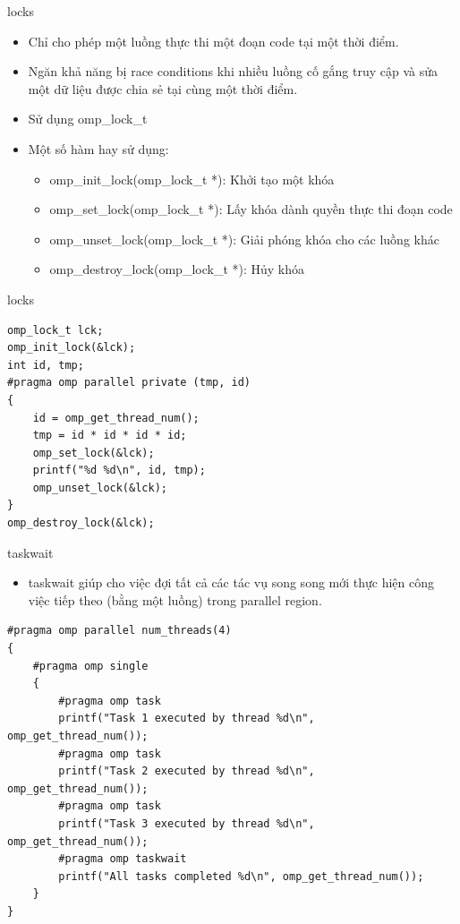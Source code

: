 \documentclass[10pt]{beamer}
\theoremstyle{remark}
\numberwithin{algocf}{section}
\numberwithin{equation}{section}
\numberwithin{dl}{section}
\numberwithin{figure}{section}
\begin{document}
\begin{frame}[fragile]{locks}
    \begin{itemize}
        \item Chỉ cho phép một luồng thực thi một đoạn code tại một thời điểm.
        \item Ngăn khả năng bị race conditions khi nhiều luồng cố gắng truy cập và sửa một dữ liệu được chia sẻ tại cùng một thời điểm.
        \item Sử dụng omp\_lock\_t
        \item Một số hàm hay sử dụng:
        \begin{itemize}
            \item omp\_init\_lock(omp\_lock\_t *): Khởi tạo một khóa
            \item omp\_set\_lock(omp\_lock\_t *): Lấy khóa dành quyền thực thi đoạn code
            \item omp\_unset\_lock(omp\_lock\_t *): Giải phóng khóa cho các luồng khác
            \item omp\_destroy\_lock(omp\_lock\_t *): Hủy khóa
        \end{itemize}
    \end{itemize}
\end{frame}

\begin{frame}[fragile]{locks}
    \begin{verbatim}
omp_lock_t lck;
omp_init_lock(&lck);
int id, tmp;
#pragma omp parallel private (tmp, id)
{
    id = omp_get_thread_num();
    tmp = id * id * id * id;
    omp_set_lock(&lck);
    printf("%d %d\n", id, tmp);
    omp_unset_lock(&lck);
}
omp_destroy_lock(&lck); 
    \end{verbatim}
\end{frame}

\begin{frame}{taskwait}
    \begin{itemize}
        \item taskwait giúp cho việc đợi tất cả các tác vụ song song mới thực hiện công việc tiếp theo (bằng một luồng) trong parallel region.
    \end{itemize}

    \begin{verbatim}
#pragma omp parallel num_threads(4)
{
    #pragma omp single
    {
        #pragma omp task
        printf("Task 1 executed by thread %d\n", omp_get_thread_num());
        #pragma omp task
        printf("Task 2 executed by thread %d\n", omp_get_thread_num());
        #pragma omp task
        printf("Task 3 executed by thread %d\n", omp_get_thread_num());
        #pragma omp taskwait
        printf("All tasks completed %d\n", omp_get_thread_num());
    }
}
    \end{verbatim}
\end{frame}
\end{document}
